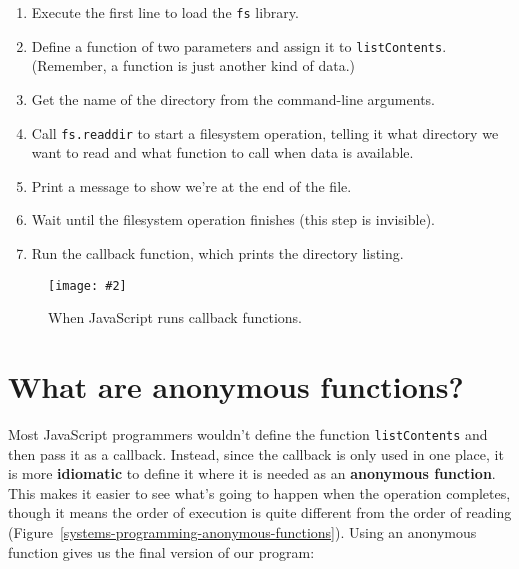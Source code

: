 \documentclass[krantzl]{krantz}
\newcommand{\figpdf}[4]{\begin{figure}%
\centering%
\texttt{[image: \#2]}%
\caption{#3}%
\label{#1}%
\end{figure}}
\newcommand{\figref}[1]{Figure~\ref{#1}}
\newcommand{\glossref}[1]{\textbf{#1}}
\begin{document}
\begin{enumerate}

\item 

Execute the first line to load the \texttt{fs} library.



\item 

Define a function of two parameters and assign it to \texttt{listContents}.
    (Remember, a function is just another kind of data.)



\item 

Get the name of the directory from the command-line arguments.



\item 

Call \texttt{fs.readdir} to start a filesystem operation,
    telling it what directory we want to read and what function to call when data is available.



\item 

Print a message to show we’re at the end of the file.



\item 

Wait until the filesystem operation finishes (this step is invisible).



\item 

Run the callback function, which prints the directory listing.



\end{enumerate}

\figpdf{systems-programming-execution-order}{./systems-programming/execution-order.pdf}{When JavaScript runs callback functions.}{0.6}

\section{What are anonymous functions?}\label{systems-programming-anonymous}


Most JavaScript programmers wouldn’t define the function \texttt{listContents}
and then pass it as a callback.
Instead,
since the callback is only used in one place,
it is more \glossref{idiomatic}
to define it where it is needed
as an \glossref{anonymous function}.
This makes it easier to see what’s going to happen when the operation completes,
though it means the order of execution is quite different from the order of reading
(\figref{systems-programming-anonymous-functions}).
Using an anonymous function gives us the final version of our program:
\end{document}
